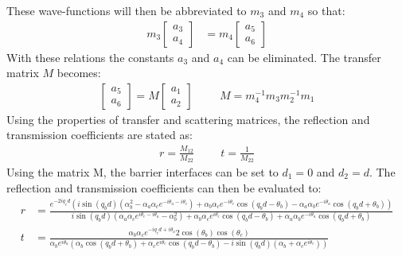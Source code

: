 		These wave-functions will then be abbreviated to $m_{3}$ and $m_{4}$ so that:
		\begin{align}
			m_{3}\left[\begin{array}{ccc}
				a_{3}\\
				a_{4}
			\end{array}\right]
			&=
			m_{4}\left[\begin{array}{ccc}
				a_{5}\\
				a_{6}
			\end{array}\right]
		\end{align}
		With these relations the constants $a_{3}$ and $a_{4}$ can be eliminated. The transfer matrix $M$ becomes:
		\begin{align}
			\left[\begin{array}{ccc}
				a_{5}\\
				a_{6}
			\end{array}\right]=M
			\left[\begin{array}{ccc}
				a_{1}\\
				a_{2}
			\end{array}\right]\hspace{1cm}
			M=m_{4}^{-1}m_{3}m_{2}^{-1}m_{1}
		\end{align}
		Using the properties of transfer and scattering matrices, the reflection and transmission coefficients are stated as:
		\begin{align}
			r=\frac{M_{12}}{M_{22}}
			\hspace{1cm}
			t=\frac{1}{M_{22}}
		\end{align}
		Using the matrix M, the barrier interfaces can be set to $d_{1}=0$ and $d_{2}=d$. The reflection and transmission coefficients can then be evaluated to:
		\begin{align}
			r&=\frac{e^{-2iq_{c}d}\left(i\sin(q_{b}d)\left(\alpha_{b}^{2}-\alpha_{a}\alpha_{c}e^{-i\theta_{a}-i\theta_{c}}\right)+\alpha_{b}\alpha_{c}e^{-i\theta_{c}}\cos(q_{b}d-\theta_{b})-\alpha_{a}\alpha_{b}e^{-i\theta_{a}}\cos(q_{b}d+\theta_{b})\right)}{i\sin(q_{b}d)\left(\alpha_{a}\alpha_{c}e^{i\theta_{c}-i\theta_{a}}-\alpha_{b}^{2}\right)+\alpha_{b}\alpha_{c}e^{i\theta_{c}}\cos(q_{b}d-\theta_{b})+\alpha_{a}\alpha_{b}e^{-i\theta_{a}}\cos(q_{b}d+\theta_{b})}
			\\
			t&=\frac{\alpha_{b}\alpha_{c}e^{-iq_{c}d+i\theta_{a}}2\cos(\theta_{b})\cos(\theta_{c})}{\alpha_{b}e^{i\theta_{a}}\left(\alpha_{b}\cos(q_{b}d+\theta_{b})+\alpha_{c}e^{i\theta_{c}}\cos(q_{b}d-\theta_{b})-i\sin(q_{b}d)\left(\alpha_{b}+\alpha_{c}e^{i\theta_{c}}\right)\right)}
		\end{align}
